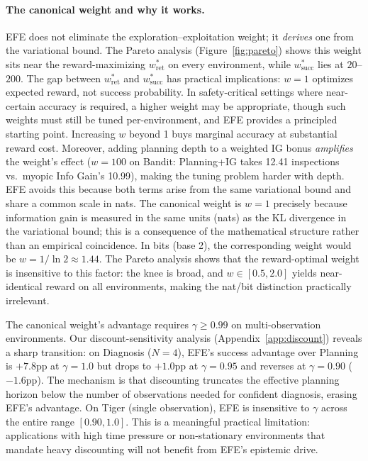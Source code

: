 \documentclass{article}
\begin{document}
\paragraph{The canonical weight and why it works.}
EFE does not eliminate the exploration--exploitation weight; it \emph{derives} one from the variational bound. The Pareto analysis (Figure~\ref{fig:pareto}) shows this weight sits near the reward-maximizing $w^*_{\text{ret}}$ on every environment, while $w^*_{\text{succ}}$ lies at $20$--$200$. The gap between $w^*_{\text{ret}}$ and $w^*_{\text{succ}}$ has practical implications: $w{=}1$ optimizes expected reward, not success probability. In safety-critical settings where near-certain accuracy is required, a higher weight may be appropriate, though such weights must still be tuned per-environment, and EFE provides a principled starting point. Increasing $w$ beyond 1 buys marginal accuracy at substantial reward cost. Moreover, adding planning depth to a weighted IG bonus \emph{amplifies} the weight's effect ($w{=}100$ on Bandit: Planning+IG takes 12.41 inspections vs.\ myopic Info Gain's 10.99), making the tuning problem harder with depth. EFE avoids this because both terms arise from the same variational bound and share a common scale in nats. The canonical weight is $w{=}1$ precisely because information gain is measured in the same units (nats) as the KL divergence in the variational bound; this is a consequence of the mathematical structure rather than an empirical coincidence. In bits (base 2), the corresponding weight would be $w = 1/\ln 2 \approx 1.44$. The Pareto analysis shows that the reward-optimal weight is insensitive to this factor: the knee is broad, and $w \in [0.5, 2.0]$ yields near-identical reward on all environments, making the nat/bit distinction practically irrelevant.

The canonical weight's advantage requires $\gamma \geq 0.99$ on multi-observation environments. Our discount-sensitivity analysis (Appendix~\ref{app:discount}) reveals a sharp transition: on Diagnosis ($N{=}4$), EFE's success advantage over Planning is $+7.8$pp at $\gamma{=}1.0$ but drops to $+1.0$pp at $\gamma{=}0.95$ and reverses at $\gamma{=}0.90$ ($-1.6$pp). The mechanism is that discounting truncates the effective planning horizon below the number of observations needed for confident diagnosis, erasing EFE's advantage. On Tiger (single observation), EFE is insensitive to $\gamma$ across the entire range $[0.90, 1.0]$. This is a meaningful practical limitation: applications with high time pressure or non-stationary environments that mandate heavy discounting will not benefit from EFE's epistemic drive.
\end{document}
